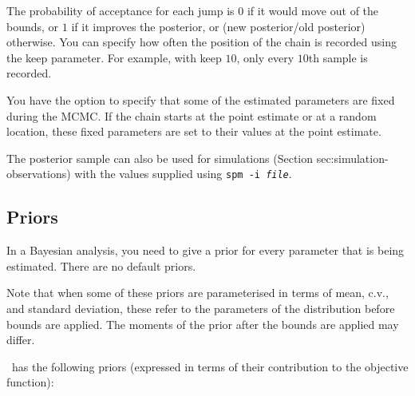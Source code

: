 

The probability of acceptance for each jump is $0$ if it would move out of the bounds, or $1$ if it improves the posterior, or (new posterior/old posterior) otherwise. You can specify how often the position of the chain is recorded using the keep parameter. For example, with keep $10$, only every $10$th sample is recorded. 

You have the option to specify that some of the estimated parameters are fixed during the MCMC. If the chain starts at the point estimate or at a random location, these fixed parameters are set to their values at the point estimate. %

The posterior sample can also be used for %
simulations (Section {sec:simulation-observations}) with the values supplied using \texttt{spm -i \emph{file}}.

\subsection{Priors\label{sec:priors}}

In a Bayesian analysis, you need to give a prior for every parameter that is being estimated. There are no default priors.  

Note that when some of these priors are parameterised in terms of mean, c.v., and standard deviation, these refer to the parameters of the distribution before bounds are applied. The moments of the prior after the bounds are applied may differ.

\SPM\ has the following priors (expressed in terms of their contribution to the objective function): 

